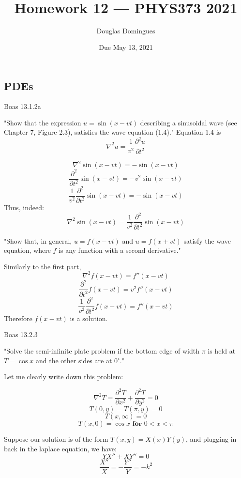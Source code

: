 \documentclass[answers]{exam}\newcommand{\repositoryInformationSetup}{     \usepackage[dvipsnames]{xcolor}     \usepackage[ angle=90, color=black, opacity=1, scale=2, ]{background}      \SetBgPosition{current page.west}      \SetBgVshift{-4.5mm}      \backgroundsetup{contents={{\color{green}\texttt{-{}-} differs from commit \texttt{f3526e2} in 0 files}}} } \newcommand{\commit}{{{\color{green}f3526e2}}}\usepackage{amsmath}
\newcommand{\grad}{\ensuremath{\nabla}\xspace}
\newcommand{\laplacian}{\ensuremath{\grad^2}\xspace}
\begin{document}
\title{Homework 12 --- PHYS373 2021}

\author{Douglas Domingues}

\date{Due May 13, 2021}

\maketitle

\begin{questions}

	\section*{PDEs}
	\question Boas 13.1.2a

	\begin{solution}
		"Show that the expression $u = \sin (x - vt)$ describing a sinusoidal wave (see Chapter 7, Figure 2.3), satisfies the wave equation (1.4)."
		Equation 1.4 is $$\laplacian u = \frac{1}{v^2} \frac{\partial^2u}{\partial t^2}$$

		$$ \laplacian \sin(x-vt) = -\sin(x-vt)$$
		$$ \frac{\partial^2}{\partial t^2} \sin(x-vt) = -v^2\sin(x-vt)$$
		$$ \frac{1}{v^2} \frac{\partial^2}{\partial t^2} \sin(x-vt) = -\sin(x-vt)$$
		Thus, indeed:
		$$ \laplacian \sin(x-vt) = \frac{1}{v^2} \frac{\partial^2}{\partial t^2} \sin(x-vt) $$

		"Show that, in general, $u = f (x - vt)$ and $u = f (x + vt)$ satisfy the wave equation, where $f$ is any
		function with a second derivative."

		Similarly to the first part,
		$$ \laplacian f(x-vt) = f''(x-vt)$$
		$$ \frac{\partial^2}{\partial t^2} f(x-vt) = v^2 f''(x-vt)$$
		$$ \frac{1}{v^2} \frac{\partial^2}{\partial t^2} f(x-vt) =  f''(x-vt)$$
		Therefore $f(x-vt)$ is a solution.

	\end{solution}
	\question Boas 13.2.3

	\begin{solution}
		"Solve the semi-infinite plate problem if the bottom edge of width $\pi$ is held at
		$T = \cos x$ and the other sides are at 0$^{\circ}$."

		Let me clearly write down this problem:

		$$ \laplacian T = \frac{\partial^2 T}{\partial x^2} + \frac{\partial^2 T}{\partial y^2} = 0$$
		$$ T(0,y) = T(\pi,y) = 0 $$
		$$ T(x,\infty) = 0$$
		$$ T(x,0) = \cos x \textbf{ for } 0<x<\pi$$

		Suppose our solution is of the form $T(x,y) = X(x)Y(y)$, and plugging in back in the laplace equation, we have:
		$$ Y X'' + X Y'' = 0$$
		$$ \frac{X''}{X} = - \frac{Y''}{Y} = -k^2 $$


\end{solution}
\end{questions}
\end{document}
